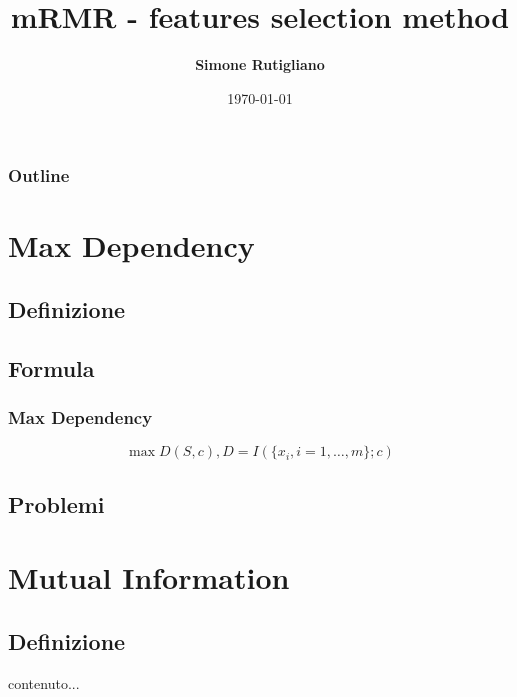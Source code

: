 \documentclass{beamer}
\title[mRMR]{mRMR - features selection method}
\institute{
\begin{small}
Corso di Laurea in Informatica Magistrale
\end{small}}
\author{\textbf{Simone Rutigliano}}
\date{\tiny{\today}}
\begin{document}

\begin{frame}
\maketitle
\end{frame}


\begin{frame}
\frametitle{Outline}
	\begin{multicols}{2}
		\tableofcontents
	\end{multicols}
\end{frame}

\section{Max Dependency}
\subsection{Definizione}
\begin{frame}
	
\end{frame}
\subsection{Formula}
\begin{frame}
	\frametitle{Max Dependency}
	\nocite{Ding:2003:MRF:937976.938050}
	\nocite{Peng05featureselection}
	
	$$ \max D(S,c), D = I(\{x_i,i=1,\dots,m \};c )$$
\end{frame}
\subsection{Problemi}
\begin{frame}
	
\end{frame}


\section{Mutual Information}
\subsection{Definizione}
\begin{frame}
	contenuto...
\end{frame}
\end{document}
